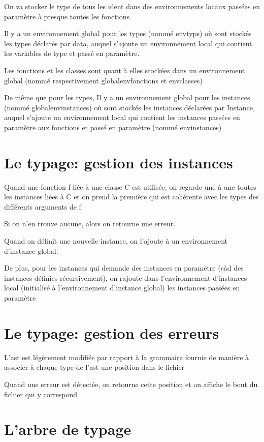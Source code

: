 \documentclass[12pt,a4paper,french]{article}
\begin{document}
On va stocker le type de tous les ident dans des environnements locaux passées en paramètre à presque toutes les fonctions.

Il y a un environnement global pour les types (nommé envtyps) où sont stockés les types déclarés par data, auquel s'ajoute un environnement
local qui contient les variables de type et passé en paramètre.

Les fonctions et les classes sont quant à elles stockées dans un environnement global (nommé respectivement globalenvfonctions et envclasses)

De même que pour les types, Il y a un environnement global pour les instances (nommé globalenvinstances) où sont stockés les instances déclarées par Instance, auquel s'ajoute un environnement
local qui contient les instances passées en paramètre aux fonctions et passé en paramètre (nommé envinstances)

\section*{Le typage: gestion des instances}

Quand une fonction f liée à une classe C est utilisée, on regarde une à une toutes les instances liées à C et on prend la
première qui est cohérente avec les types des différents arguments de f

Si on n'en trouve aucune, alors on retourne une erreur.

Quand on définit une nouvelle instance, on l'ajoute à un environnement d'instance global.

De plus, pour les instances qui demande des instances en paramètre (càd des instances définies récursivement),
on rajoute dans l'environnement d'instances local (initialisé à l'environnement d'instance global) les instances passées en paramètre



\section*{Le typage: gestion des erreurs}

L'ast est légèrement modifiée par rapport à la grammaire fournie de manière à associer à chaque type de l'ast une position dans le fichier

Quand une erreur est détectée, on retourne cette position et on affiche le bout du fichier qui y correspond


\section*{L'arbre de typage}
\end{document}

